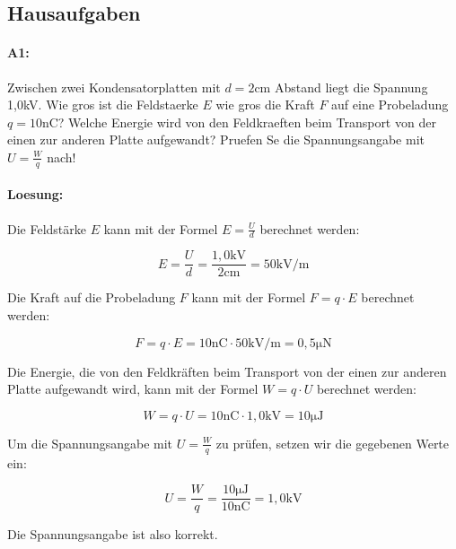 \documentclass[a4paper]{report}
\begin{document}
\begin{tcolorbox}[colback=gray!10!white,colframe=gray!80!black]
  \subsection{Hausaufgaben} \paragraph{A1:} 
  Zwischen zwei Kondensatorplatten mit $d=2$cm Abstand liegt die Spannung
  1,0kV. Wie gros ist die Feldstaerke $E$ wie gros die Kraft $F$ auf eine
  Probeladung $q=10$nC? Welche Energie wird von den Feldkraeften beim Transport
  von der einen zur anderen Platte aufgewandt? Pruefen Se die Spannungsangabe
  mit $U=\frac{W}{q}$ nach!



\paragraph{Loesung:}
Die Feldstärke $E$ kann mit der Formel $E=\frac{U}{d}$ berechnet werden:

\begin{equation*}
    E=\frac{U}{d}=\frac{1,0\mathrm{kV}}{2\mathrm{cm}}=50\mathrm{kV/m}
\end{equation*}

Die Kraft auf die Probeladung $F$ kann mit der Formel $F=q\cdot E$ berechnet werden:

\begin{equation*}
    F=q\cdot E=10\mathrm{nC}\cdot 50\mathrm{kV/m}=0,5\mathrm{\mu N}
\end{equation*}

Die Energie, die von den Feldkräften beim Transport von der einen zur anderen
Platte aufgewandt wird, kann mit der Formel $W=q\cdot U$ berechnet werden:

\begin{equation*}
    W=q\cdot U=10\mathrm{nC}\cdot 1,0\mathrm{kV}=10\mathrm{\mu J}
\end{equation*}

Um die Spannungsangabe mit $U=\frac{W}{q}$ zu prüfen, setzen wir die gegebenen Werte ein:

\begin{equation*}
    U=\frac{W}{q}=\frac{10\mathrm{\mu J}}{10\mathrm{nC}}=1,0\mathrm{kV}
\end{equation*}

Die Spannungsangabe ist also korrekt.
\end{tcolorbox}
\end{document}

